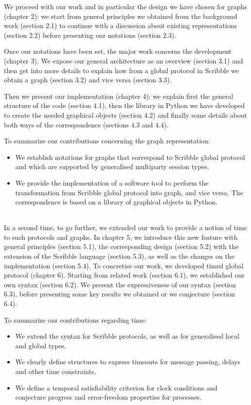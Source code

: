 \documentclass[a4paper,11pt,twoside]{report}
\begin{document}
We proceed with our work and in particular the design we have chosen for graphs (chapter 2): we start from general principles we obtained from the background work (section 2.1) to continue with a discussion about existing representations (section 2.2) before presenting our notations (section 2.3).

Once our notations have been set, the major work concerns the development (chapter 3). We expose our general architecture as an overview (section 3.1) and then get into more details to explain how from a global protocol in Scribble we obtain a graph (section 3.2) and vice versa (section 3.3).

Then we present our implementation (chapter 4): we explain first the general structure of the code (section 4.1), then the library in Python we have developed to create the needed graphical objects (section 4.2) and finally some details about both ways of the correspondence (sections 4.3 and 4.4).

To summarize our contributions concerning the graph representation:
\begin{itemize}
\item We establish notations for graphs that correspond to Scribble global protocol and which are supported by generalised multiparty session types.
\item We provide the implementation of a software tool to perform the transformation from Scribble global protocol into graph, and vice versa. The correspondence is based on a library of graphical objects in Python.
\end{itemize}
~~\\
In a second time, to go further, we extended our work to provide a notion of time to such protocols and graphs. In chapter 5, we introduce this new feature with general principles (section 5.1), the corresponding design (section 5.2) with the extension of the Scribble language (section 5.3), as well as the changes on the implementation (section 5.4). To concretise our work, we developed timed global protocol (chapter 6). Starting from related work (section 6.1), we established our own syntax (section 6.2). We present the expressiveness of our syntax (section 6.3), before presenting some key results we obtained or we conjecture (section 6.4).

To summarize our contributions regarding time:
\begin{itemize}
\item We extend the syntax for Scribble protocols, as well as for generalised local and global types.
\item We clearly define structures to express timeouts for message passing, delays and other time constraints.
\item We define a temporal satisfiability criterion for clock conditions and conjecture progress and error-freedom properties for processes.
\end{itemize}
\end{document}
